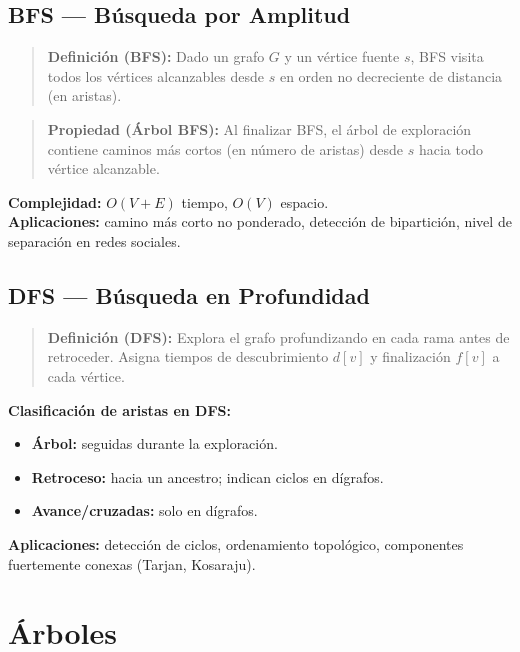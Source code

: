 \documentclass[12pt, letterpaper]{article}
\begin{document}
	\subsection{BFS — Búsqueda por Amplitud}
	
	\begin{quote}
		\textbf{Definición (BFS):}
		Dado un grafo $G$ y un vértice fuente $s$, BFS visita todos los vértices alcanzables desde $s$ en orden no decreciente de distancia (en aristas).
	\end{quote}
	
	\begin{quote}
		\textbf{Propiedad (Árbol BFS):}
		Al finalizar BFS, el árbol de exploración contiene caminos más cortos (en número de aristas) desde $s$ hacia todo vértice alcanzable.
	\end{quote}
	
	\textbf{Complejidad:} $O(V + E)$ tiempo, $O(V)$ espacio.\\
	\textbf{Aplicaciones:} camino más corto no ponderado, detección de bipartición, nivel de separación en redes sociales.
	
	\subsection{DFS — Búsqueda en Profundidad}
	
	\begin{quote}
		\textbf{Definición (DFS):}
		Explora el grafo profundizando en cada rama antes de retroceder. Asigna tiempos de descubrimiento $d[v]$ y finalización $f[v]$ a cada vértice.
	\end{quote}
	
	\textbf{Clasificación de aristas en DFS:}
	\begin{itemize}[noitemsep]
		\item \textbf{Árbol:} seguidas durante la exploración.
		\item \textbf{Retroceso:} hacia un ancestro; indican ciclos en dígrafos.
		\item \textbf{Avance/cruzadas:} solo en dígrafos.
	\end{itemize}
	
	\textbf{Aplicaciones:} detección de ciclos, ordenamiento topológico, componentes fuertemente conexas (Tarjan, Kosaraju).
	
	\section{Árboles}
	
\end{document}

